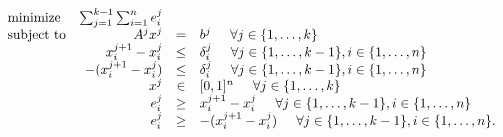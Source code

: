 \begin{equation}
\begin{array}{lrcl}
\mbox{minimize} & \sum_{j=1}^{k-1} \sum_{i=1}^n e_i^j \\ 
\mbox{subject to} & A^j x^j &=& b^j \hspace{5mm} \forall j \in \{1,\dots, k\} \\
  & x_i^{j+1} - x_i^{j} &\leq& \delta_i^j  \hspace{5mm} \forall j \in \{1,\dots, k-1\}, i \in \{1,\dots,n\} \\
  &  -(x_i^{j+1} - x_i^{j}) &\leq& \delta_i^j  \hspace{5mm} \forall j \in \{1,\dots, k-1\}, i \in \{1,\dots,n\} \\
  & x^j &\in& [0,1]^n \hspace{5mm} \forall j \in \{1,\dots, k\} \\
  & e_i^j &\geq& x_i^{j+1} - x_i^{j} \hspace{5mm} \forall j \in \{1,\dots, k-1\}, i \in \{1,\dots,n\}\\
  & e_i^j &\geq& -(x_i^{j+1} - x_i^{j}) \hspace{5mm} \forall j \in \{1,\dots, k-1\}, i \in \{1,\dots,n\}.
\end{array}
\end{equation}

